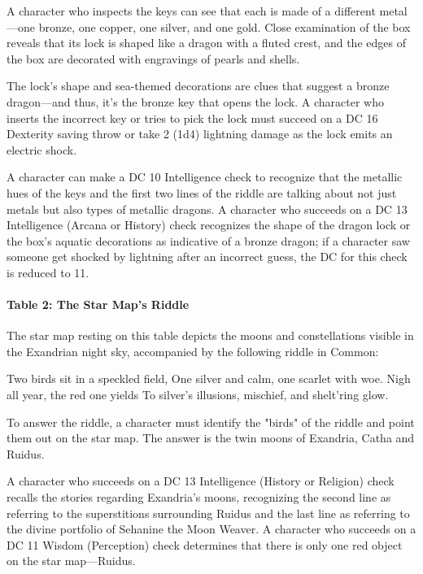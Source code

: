 \documentclass[10pt,a4paper,twoside,twocolumn,openany,nodeprecatedcode]{dndbook}
\begin{document}
A character who inspects the keys can see that each is made of a different metal—one bronze, one copper, one silver, and one gold. Close examination of the box reveals that its lock is shaped like a dragon with a fluted crest, and the edges of the box are decorated with engravings of pearls and shells.

The lock's shape and sea-themed decorations are clues that suggest a bronze dragon—and thus, it's the bronze key that opens the lock. A character who inserts the incorrect key or tries to pick the lock must succeed on a DC 16 Dexterity saving throw or take 2 (1d4) lightning damage as the lock emits an electric shock.

A character can make a DC 10 Intelligence check to recognize that the metallic hues of the keys and the first two lines of the riddle are talking about not just metals but also types of metallic dragons. A character who succeeds on a DC 13 Intelligence (Arcana or History) check recognizes the shape of the dragon lock or the box's aquatic decorations as indicative of a bronze dragon; if a character saw someone get shocked by lightning after an incorrect guess, the DC for this check is reduced to 11.

\paragraph{Table 2: The Star Map's Riddle}
The star map resting on this table depicts the moons and constellations visible in the Exandrian night sky, accompanied by the following riddle in Common:

\begin{DndReadAloud}{}
Two birds sit in a speckled field, One silver and calm, one scarlet with woe. Nigh all year, the red one yields To silver's illusions, mischief, and shelt'ring glow.

\end{DndReadAloud}

To answer the riddle, a character must identify the "birds" of the riddle and point them out on the star map. The answer is the twin moons of Exandria, Catha and Ruidus.

A character who succeeds on a DC 13 Intelligence (History or Religion) check recalls the stories regarding Exandria's moons, recognizing the second line as referring to the superstitions surrounding Ruidus and the last line as referring to the divine portfolio of Sehanine the Moon Weaver. A character who succeeds on a DC 11 Wisdom (Perception) check determines that there is only one red object on the star map—Ruidus.
\end{document}
